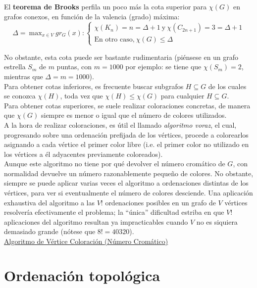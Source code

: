 El \textbf{teorema de Brooks} perfila un poco más la cota superior para $\chi (G)$ en grafos conexos, en función de la valencia (grado) máxima:
\[ \Delta =\ \mbox{max}_{x \in V}\ gr_G(x):
\left\{ 
\begin{array}{l}
\chi (K_n) = n = \Delta + 1\ \mbox{y}\ \chi (C_{2n + 1}) = 3 = \Delta + 1 \\
\mbox{En otro caso,}\ \chi (G) \leq \Delta
\end{array}
\right. \]

No obstante, esta cota puede ser bastante rudimentaria (piénsese en un grafo estrella $S_m$ de $m$ puntas, con $m = 1000$ por ejemplo: se tiene que $\chi (S_m) = 2$, mientras que $\Delta = m = 1000$).\\

Para obtener cotas inferiores, es frecuente buscar subgrafos $H \subseteq G$ de los cuales se conozca $\chi (H)$, toda vez que $\chi (H) \leq \chi (G)$ para cualquier $H \subseteq G$.\\

Para obtener cotas superiores, se suele realizar coloraciones concretas, de manera que $\chi (G)$ siempre es menor o igual que el número de colores utilizados.\\

A la hora de realizar coloraciones, es útil el llamado \emph{algoritmo voraz}, el cual, progresando sobre una ordenación prefijada de los vértices, procede a colorearlos asignando a cada vértice el primer color libre (i.e. el primer color no utilizado en los vértices a él adyacentes previamente coloreados).\\

Aunque este algoritmo no tiene por qué devolver el número cromático de $G$, con normalidad devuelve un número razonablemente pequeño de colores. No obstante, siempre se puede aplicar varias veces el algoritmo a ordenaciones distintas de los vértices, para ver si eventualmente el número de colores desciende. Una aplicación exhaustiva del algoritmo a las $V!$ ordenaciones posibles en un grafo de $V$ vértices resolvería efectivamente el problema; la ``única'' dificultad estriba en que $V!$ aplicaciones del algoritmo resultan ya impracticables cuando $V$ no es siquiera demasiado grande (nótese que $8! = 40320$).\\

\underline{Algoritmo de Vértice Coloración (Número Cromático)}\\


\section{Ordenación topológica}

